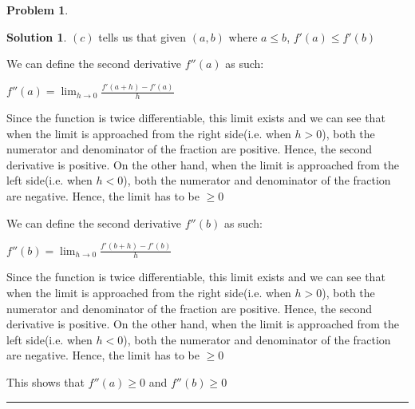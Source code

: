 \documentclass{article}
\theoremstyle{definition}
\newtheorem{problem}{Problem}
\def\fline{\rule{0.75\linewidth}{0.5pt}}
\newcommand{\finishline}{\begin{center}\fline\end{center}}
\newtheorem*{solution*}{Solution}
\newenvironment{solution}{\begin{solution*}}{{\finishline} \end{solution*}}
\begin{document}
\begin{problem}
\begin{enumerate}
\begin{solution}
                $(c)$ tells us that given $(a, b)$ where $a \leq b$, $f'(a) \leq f'(b)$ 

                We can define the second derivative $f''(a)$ as such: \newline 

                $f''(a) = \lim_{h\to 0} \frac{f'(a + h) - f'(a)}{h}$

                Since the function is twice differentiable, this limit exists and we can see that when the limit is approached from the right side(i.e. when $h > 0$), both the numerator and denominator of the fraction are positive. Hence, the second derivative is positive. On the other hand, when the limit is approached from the left side(i.e. when $h < 0$), both the numerator and denominator of the fraction are negative. Hence, the limit has to be $\geq 0$ \newline 

                We can define the second derivative $f''(b)$ as such: \newline 

                $f''(b) = \lim_{h\to 0} \frac{f'(b + h) - f'(b)}{h}$

                Since the function is twice differentiable, this limit exists and we can see that when the limit is approached from the right side(i.e. when $h > 0$), both the numerator and denominator of the fraction are positive. Hence, the second derivative is positive. On the other hand, when the limit is approached from the left side(i.e. when $h < 0$), both the numerator and denominator of the fraction are negative. Hence, the limit has to be $\geq 0$


                This shows that $f''(a) \geq 0$ and $f''(b) \geq 0$
                
            \end{solution}
    \end{enumerate}
\end{problem}
\end{document}
